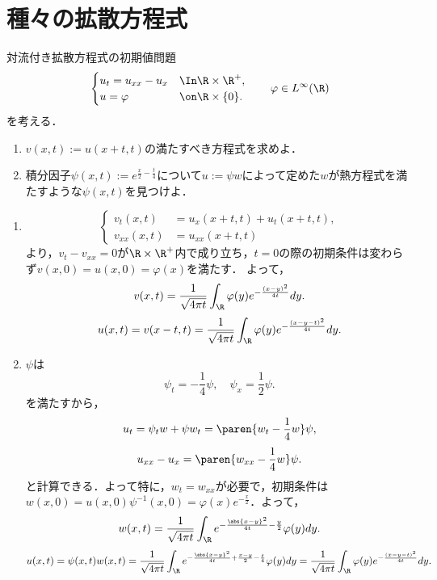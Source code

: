 \documentclass[uplatex,dvipdfmx]{jsreport}
\begin{document}
\section{種々の拡散方程式}

\begin{problem}
    対流付き拡散方程式の初期値問題
    \[\begin{cases}
        u_t=u_{xx}-u_x&\In\R\times\R^+,\\
        u=\varphi&\on\R\times\{0\}.
    \end{cases}\qquad \varphi\in L^\infty(\R)\]
    を考える．
    \begin{enumerate}
        \item $v(x,t):=u(x+t,t)$の満たすべき方程式を求めよ．
        \item 積分因子$\psi(x,t):=e^{\frac{x}{2}-\frac{t}{4}}$について$u:=\psi w$によって定めた$w$が熱方程式を満たすような$\psi(x,t)$を見つけよ．
    \end{enumerate}
\end{problem}
\begin{Proof}[\underline{\bf【解】}]\mbox{}
    \begin{enumerate}
        \item \[\begin{cases}
            v_t(x,t)&=u_x(x+t,t)+u_t(x+t,t),\\
            v_{xx}(x,t)&=u_{xx}(x+t,t)
        \end{cases}\]
        より，$v_t-v_{xx}=0$が$\R\times\R^+$内で成り立ち，$t=0$の際の初期条件は変わらず$v(x,0)=u(x,0)=\varphi(x)$を満たす．
        よって，
        \[v(x,t)=\frac{1}{\sqrt{4\pi t}}\int_\R \varphi(y)e^{-\frac{(x-y)^2}{4t}}dy.\]
        \[u(x,t)=v(x-t,t)=\frac{1}{\sqrt{4\pi t}}\int_\R \varphi(y)e^{-\frac{(x-y-t)^2}{4t}}dy.\]
        \item $\psi$は
        \[\psi_t=-\frac{1}{4}\psi,\quad\psi_x=\frac{1}{2}\psi.\]
        を満たすから，
        \[u_t=\psi_tw+\psi w_t=\paren{w_t-\frac{1}{4}w}\psi,\]
        \[u_{xx}-u_x=\paren{w_{xx}-\frac{1}{4}w}\psi.\]
        と計算できる．よって特に，$w_t=w_{xx}$が必要で，初期条件は$w(x,0)=u(x,0)\psi^{-1}(x,0)=\varphi(x)e^{-\frac{x}{2}}$．よって，
        \[w(x,t)=\frac{1}{\sqrt{4\pi t}}\int_\R e^{-\frac{\abs{x-y}^2}{4t}-\frac{y}{2}}\varphi(y)dy.\]
        \[u(x,t)=\psi(x,t)w(x,t)=\frac{1}{\sqrt{4\pi t}}\int_\R e^{-\frac{\abs{x-y}^2}{4t}+\frac{x-y}{2}-\frac{t}{4}}\varphi(y)dy=\frac{1}{\sqrt{4\pi t}}\int_\R \varphi(y)e^{-\frac{(x-y-t)^2}{4t}}dy.\]
    \end{enumerate}
\end{Proof}
\end{document}
